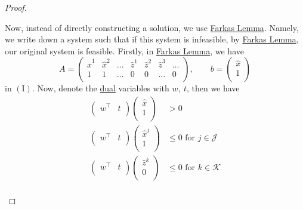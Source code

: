\begin{proof}
\begin{enumerate}
		      Now, instead of directly constructing a solution, we use \hyperref[lma:Farkas]{Farkas Lemma}. Namely, we write down a system such that if this system is infeasible, by \hyperref[lma:Farkas]{Farkas Lemma}, our original system is feasible. Firstly, in \hyperref[lma:Farkas]{Farkas Lemma}, we have
		      \[
			      A = \begin{pmatrix}
				      \hat{x}^1 & \hat{x}^2 & \dots & \hat{z}^1 & \hat{z}^2 & \hat{z}^3 & \dots \\
				      1         & 1         & \dots & 0         & 0         & \dots     & 0     \\
			      \end{pmatrix},\qquad b = \begin{pmatrix}
				      \hat{x} \\
				      1       \\
			      \end{pmatrix}
		      \]
		      in \((\mathrm{I})\). Now, denote the \hyperref[def:dual]{dual} variables with \(w,\ t\), then we have
		      \[
			      \begin{split}
				      \begin{pmatrix}
					      w^{\top} & t \\
				      \end{pmatrix}\begin{pmatrix}
					      \hat{x} \\
					      1       \\
				      \end{pmatrix}&>0\\
				      \begin{pmatrix}
					      w^{\top} & t \\
				      \end{pmatrix}\begin{pmatrix}
					      \hat{x}^j \\
					      1         \\
				      \end{pmatrix}&\leq 0 \text{ for }j\in\mathcal{J}\\
				      \begin{pmatrix}
					      w^{\top} & t \\
				      \end{pmatrix}\begin{pmatrix}
					      \hat{z}^k \\
					      0         \\
				      \end{pmatrix}&\leq 0 \text{ for }k\in\mathcal{K}\\

\end{split}\]
\end{enumerate}
\end{proof}
